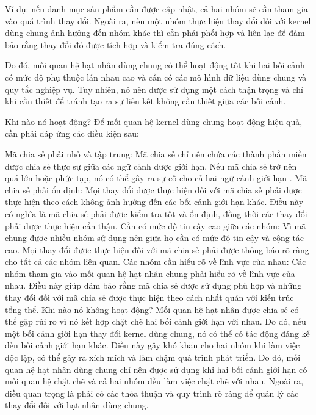 Ví dụ: nếu danh mục sản phẩm cần được cập nhật, cả hai nhóm sẽ cần tham gia vào quá trình thay đổi. Ngoài ra, nếu một nhóm thực hiện thay đổi đối với kernel dùng chung ảnh hưởng đến nhóm khác thì cần phải phối hợp và liên lạc để đảm bảo rằng thay đổi đó được tích hợp và kiểm tra đúng cách.

Do đó, mối quan hệ hạt nhân dùng chung có thể hoạt động tốt khi hai bối cảnh có mức độ phụ thuộc lẫn nhau cao và cần có các mô hình dữ liệu dùng chung và quy tắc nghiệp vụ. Tuy nhiên, nó nên được sử dụng một cách thận trọng và chỉ khi cần thiết để tránh tạo ra sự liên kết không cần thiết giữa các bối cảnh.

Khi nào nó hoạt động?
Để mối quan hệ kernel dùng chung hoạt động hiệu quả, cần phải đáp ứng các điều kiện sau:

Mã chia sẻ phải nhỏ và tập trung: Mã chia sẻ chỉ nên chứa các thành phần miền được chia sẻ thực sự giữa các ngữ cảnh được giới hạn. Nếu mã chia sẻ trở nên quá lớn hoặc phức tạp, nó có thể gây ra sự cố cho cả hai ngữ cảnh giới hạn .
Mã chia sẻ phải ổn định: Mọi thay đổi được thực hiện đối với mã chia sẻ phải được thực hiện theo cách không ảnh hưởng đến các bối cảnh giới hạn khác. Điều này có nghĩa là mã chia sẻ phải được kiểm tra tốt và ổn định, đồng thời các thay đổi phải được thực hiện cẩn thận.
Cần có mức độ tin cậy cao giữa các nhóm: Vì mã chung được nhiều nhóm sử dụng nên giữa họ cần có mức độ tin cậy và cộng tác cao. Mọi thay đổi được thực hiện đối với mã chia sẻ phải được thông báo rõ ràng cho tất cả các nhóm liên quan.
Các nhóm cần hiểu rõ về lĩnh vực của nhau: Các nhóm tham gia vào mối quan hệ hạt nhân chung phải hiểu rõ về lĩnh vực của nhau. Điều này giúp đảm bảo rằng mã chia sẻ được sử dụng phù hợp và những thay đổi đối với mã chia sẻ được thực hiện theo cách nhất quán với kiến trúc tổng thể.
Khi nào nó không hoạt động?
Mối quan hệ hạt nhân được chia sẻ có thể gặp rủi ro vì nó kết hợp chặt chẽ hai bối cảnh giới hạn với nhau. Do đó, nếu một bối cảnh giới hạn thay đổi kernel dùng chung, nó có thể có tác động đáng kể đến bối cảnh giới hạn khác. Điều này gây khó khăn cho hai nhóm khi làm việc độc lập, có thể gây ra xích mích và làm chậm quá trình phát triển. Do đó, mối quan hệ hạt nhân dùng chung chỉ nên được sử dụng khi hai bối cảnh giới hạn có mối quan hệ chặt chẽ và cả hai nhóm đều làm việc chặt chẽ với nhau. Ngoài ra, điều quan trọng là phải có các thỏa thuận và quy trình rõ ràng để quản lý các thay đổi đối với hạt nhân dùng chung.

